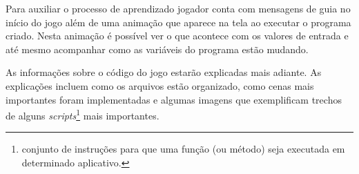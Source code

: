 Para auxiliar o processo de aprendizado jogador conta com mensagens de guia no 
início do jogo além de uma animação que aparece na tela ao executar o programa 
criado. Nesta animação é possível ver o que acontece com os valores de entrada 
e até mesmo acompanhar como as variáveis do programa estão mudando.

As informações sobre o código do jogo estarão explicadas mais adiante. As 
explicações incluem como os arquivos estão organizado, como cenas mais 
importantes foram implementadas e algumas imagens que exemplificam trechos de 
alguns \textit{scripts}\footnote{conjunto de instruções para que uma função 
(ou método) seja executada em determinado aplicativo.} mais importantes.
